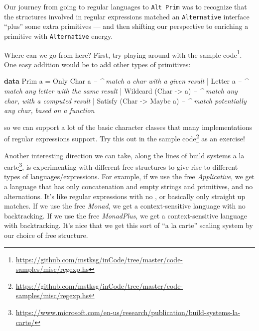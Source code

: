 \documentclass[]{article}
\newenvironment{Shaded}{}{}
\newcommand{\CommentTok}[1]{\textcolor[rgb]{0.38,0.63,0.69}{\textit{#1}}}
\newcommand{\DataTypeTok}[1]{\textcolor[rgb]{0.56,0.13,0.00}{#1}}
\newcommand{\FunctionTok}[1]{\textcolor[rgb]{0.02,0.16,0.49}{#1}}
\newcommand{\KeywordTok}[1]{\textcolor[rgb]{0.00,0.44,0.13}{\textbf{#1}}}
\newcommand{\NormalTok}[1]{#1}
\newcommand{\OtherTok}[1]{\textcolor[rgb]{0.00,0.44,0.13}{#1}}
\renewcommand{\href}[2]{#2\footnote{\url{#1}}}
\begin{document}
Our journey from going to regular languages to \texttt{Alt\ Prim} was to
recognize that the structures involved in regular expressions matched an
\texttt{Alternative} interface ``plus'' some extra primitives --- and then
shifting our perspective to enriching a primitive with \texttt{Alternative}
energy.

Where can we go from here? First, try playing around with the
\href{https://github.com/mstksg/inCode/tree/master/code-samples/misc/regexp.hs}{sample
code}. One easy addition would be to add other types of primitives:

\begin{Shaded}
\begin{Highlighting}[]
\KeywordTok{data} \DataTypeTok{Prim}\NormalTok{ a }\FunctionTok{=}
    \DataTypeTok{Only} \DataTypeTok{Char}\NormalTok{ a                 }\CommentTok{-- ^ match a char with a given result}
  \FunctionTok{|} \DataTypeTok{Letter}\NormalTok{ a                    }\CommentTok{-- ^ match any letter with the same result}
  \FunctionTok{|} \DataTypeTok{Wildcard}\NormalTok{ (}\DataTypeTok{Char} \OtherTok{->}\NormalTok{ a)        }\CommentTok{-- ^ match any char, with a computed result}
  \FunctionTok{|} \DataTypeTok{Satisfy}\NormalTok{ (}\DataTypeTok{Char} \OtherTok{->} \DataTypeTok{Maybe}\NormalTok{ a)   }\CommentTok{-- ^ match potentially any char, based on a function}
\end{Highlighting}
\end{Shaded}

so we can support a lot of the basic character classes that many implementations
of regular expressions support. Try this out in the
\href{https://github.com/mstksg/inCode/tree/master/code-samples/misc/regexp.hs}{sample
code} as an exercise!

Another interesting direction we can take, along the lines of
\href{https://www.microsoft.com/en-us/research/publication/build-systems-la-carte/}{build
systems a la carte}, is experimenting with different free structures to give
rise to different types of languages/expressions. For example, if we use the
free \emph{Applicative}, we get a language that has only concatenation and empty
strings and primitives, and no alternations. It's like regular expressions with
no \texttt{\textbar{}}, or basically only straight up matches. If we use the
free \emph{Monad}, we get a context-sensitive language with no backtracking. If
we use the free \emph{MonadPlus}, we get a context-sensitive language with
backtracking. It's nice that we get this sort of ``a la carte'' scaling system
by our choice of free structure.
\end{document}
